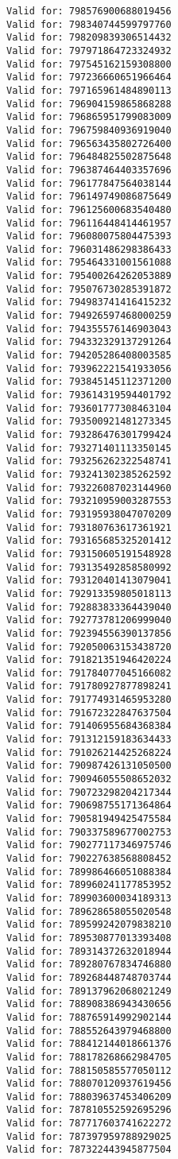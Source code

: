 \documentclass[11pt]{article}
\begin{document}
\begin{Verbatim}[commandchars=\\\{\}]
Valid for: 798576900688019456
Valid for: 798340744599797760
Valid for: 798209839306514432
Valid for: 797971864723324932
Valid for: 797545162159308800
Valid for: 797236660651966464
Valid for: 797165961484890113
Valid for: 796904159865868288
Valid for: 796865951799083009
Valid for: 796759840936919040
Valid for: 796563435802726400
Valid for: 796484825502875648
Valid for: 796387464403357696
Valid for: 796177847564038144
Valid for: 796149749086875649
Valid for: 796125600683540480
Valid for: 796116448414461957
Valid for: 796080075804475393
Valid for: 796031486298386433
Valid for: 795464331001561088
Valid for: 795400264262053889
Valid for: 795076730285391872
Valid for: 794983741416415232
Valid for: 794926597468000259
Valid for: 794355576146903043
Valid for: 794332329137291264
Valid for: 794205286408003585
Valid for: 793962221541933056
Valid for: 793845145112371200
Valid for: 793614319594401792
Valid for: 793601777308463104
Valid for: 793500921481273345
Valid for: 793286476301799424
Valid for: 793271401113350145
Valid for: 793256262322548741
Valid for: 793241302385262592
Valid for: 793226087023144960
Valid for: 793210959003287553
Valid for: 793195938047070209
Valid for: 793180763617361921
Valid for: 793165685325201412
Valid for: 793150605191548928
Valid for: 793135492858580992
Valid for: 793120401413079041
Valid for: 792913359805018113
Valid for: 792883833364439040
Valid for: 792773781206999040
Valid for: 792394556390137856
Valid for: 792050063153438720
Valid for: 791821351946420224
Valid for: 791784077045166082
Valid for: 791780927877898241
Valid for: 791774931465953280
Valid for: 791672322847637504
Valid for: 791406955684368384
Valid for: 791312159183634433
Valid for: 791026214425268224
Valid for: 790987426131050500
Valid for: 790946055508652032
Valid for: 790723298204217344
Valid for: 790698755171364864
Valid for: 790581949425475584
Valid for: 790337589677002753
Valid for: 790277117346975746
Valid for: 790227638568808452
Valid for: 789986466051088384
Valid for: 789960241177853952
Valid for: 789903600034189313
Valid for: 789628658055020548
Valid for: 789599242079838210
Valid for: 789530877013393408
Valid for: 789314372632018944
Valid for: 789280767834746880
Valid for: 789268448748703744
Valid for: 789137962068021249
Valid for: 788908386943430656
Valid for: 788765914992902144
Valid for: 788552643979468800
Valid for: 788412144018661376
Valid for: 788178268662984705
Valid for: 788150585577050112
Valid for: 788070120937619456
Valid for: 788039637453406209
Valid for: 787810552592695296
Valid for: 787717603741622272
Valid for: 787397959788929025
Valid for: 787322443945877504

\end{Verbatim}
\end{document}
